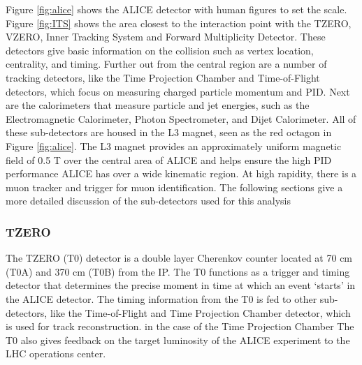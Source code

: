 Figure \ref{fig:alice} shows the ALICE detector with human figures to set the scale.  Figure \ref{fig:ITS} shows the area closest to the interaction point with the TZERO, VZERO, Inner Tracking System and Forward Multiplicity Detector.  These detectors give basic information on the collision such as vertex location, centrality, and timing.   Further out from the central region are a number of tracking detectors, like the Time Projection Chamber and Time-of-Flight detectors, which focus on  measuring charged particle momentum and PID.  Next are the calorimeters that measure particle and jet energies, such as the Electromagnetic Calorimeter, Photon Spectrometer, and  Dijet Calorimeter.  All of these sub-detectors are housed in the L3 magnet, seen as the red octagon in Figure \ref{fig:alice}.   The L3 magnet provides an approximately uniform magnetic field of 0.5 T over the central area of ALICE and helps ensure the high PID performance ALICE has over a wide kinematic region\cite{Gligorov:2018vkc}.  At high rapidity, there is a muon tracker and trigger for muon identification.  The following sections give a more detailed discussion of the sub-detectors used for this analysis


\subsubsection{TZERO}
The TZERO (T0)\cite{Bondila:2005xy} detector is a double layer Cherenkov counter located at 70 cm (T0A) and 370 cm (T0B) from the IP.  The T0 functions as a trigger and timing detector that determines the precise moment in time at which an event `starts' in the ALICE detector.  The timing information from the T0 is fed to other sub-detectors, like the Time-of-Flight and Time Projection Chamber detector, which is used for track reconstruction. in the case of the Time Projection Chamber  The T0 also gives feedback on the target luminosity of the ALICE experiment to the LHC operations center.  


